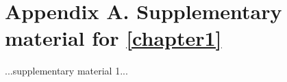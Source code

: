 
\anglais

\chapter*{Appendix A. Supplementary material for \autoref{chapter1}}

...supplementary material 1...

\endinput
